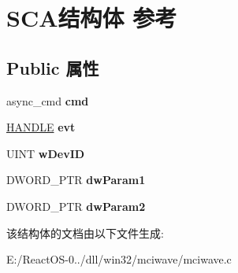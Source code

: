 \hypertarget{struct_s_c_a}{}\section{S\+C\+A结构体 参考}
\label{struct_s_c_a}
\subsection*{Public 属性}
\begin{DoxyCompactItemize}
\item 
\mbox{\label{struct_s_c_a_acbad254882c47dd99047a4dc253b7fff}} 
async\+\_\+cmd {\bfseries cmd}
\item 
\mbox{\label{struct_s_c_a_a4ef041cfa5bb5c6817399afc9b666606}} 
\hyperlink{interfacevoid}{H\+A\+N\+D\+LE} {\bfseries evt}
\item 
\mbox{\label{struct_s_c_a_a0bc326002fdf77ae7a65a88c921a50fb}} 
U\+I\+NT {\bfseries w\+Dev\+ID}
\item 
\mbox{\label{struct_s_c_a_a37f2b7a54fa70017505bbda403e46ddf}} 
D\+W\+O\+R\+D\+\_\+\+P\+TR {\bfseries dw\+Param1}
\item 
\mbox{\label{struct_s_c_a_a7c07c0c03c319723512ccd20aeeab08a}} 
D\+W\+O\+R\+D\+\_\+\+P\+TR {\bfseries dw\+Param2}
\end{DoxyCompactItemize}


该结构体的文档由以下文件生成\+:\begin{DoxyCompactItemize}
\item 
E\+:/\+React\+O\+S-\/0../dll/win32/mciwave/mciwave.\+c\end{DoxyCompactItemize}
